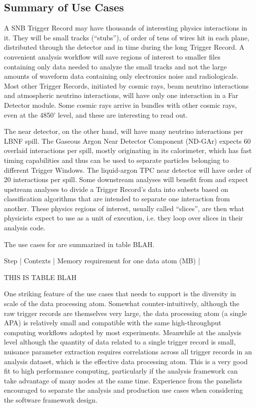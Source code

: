 \documentclass[../main-v1.tex]{subfiles}
\begin{document}
\subsection{Summary of Use Cases}


A SNB Trigger Record may have thousands of interesting physics interactions in it.  They will be small tracks (“stubs”), of order of tens of wires hit in each plane, distributed through the detector and in time during the long Trigger Record.  A convenient analysis workflow will save regions of interest to smaller files containing only data needed to analyze the small tracks and not the large amounts of waveform data containing only electronics noise and radiologicals.  Most other Trigger Records, initiated by cosmic rays, beam neutrino interactions and atmospheric neutrino interactions, will have only one interaction in a Far Detector module.  Some cosmic rays arrive in bundles with other cosmic rays, even at the 4850’ level, and these are interesting to read out.

The near detector, on the other hand, will have many neutrino interactions per LBNF spill.  The Gaseous Argon Near Detector Component (ND-GAr) expects 60 overlaid interactions per spill, mostly originating in its calorimeter, which has fast timing capabilities and thus can be used to separate particles belonging to different Trigger Windows.  The liquid-argon TPC near detector will have order of 20 interactions per spill.  Some downstream analyses will benefit from and expect upstream analyses to divide a Trigger Record’s data into subsets based on classification algorithms that are intended to separate one interaction from another.  These physics regions of interest, usually called “slices”, are then what physicists expect to use as a unit of execution, i.e. they loop over slices in their analysis code.


The use cases for  are summarized in table BLAH.

Step | Contexts | Memory requirement for one data atom (MB) |

THIS IS TABLE BLAH


One striking feature of the use cases that  needs to support is the diversity in scale of the data processing atom.  Somewhat counter-intuitively, although the raw trigger records are themselves very large, the data processing atom (a single APA) is relatively small and compatible with the same high-throughput computing workflows adopted by most  experiments.  Meanwhile at the analysis level although the quantity of data related to a single trigger record is small, nuisance parameter extraction requires correlations across all trigger records in an analysis dataset, which is the effective data processing atom.  This is a very good fit to high performance computing, particularly if the analysis framework can take advantage of many  nodes at the same time. Experience from the  panelists encouraged  to separate the analysis and production use cases when considering the software framework design.
\end{document}
